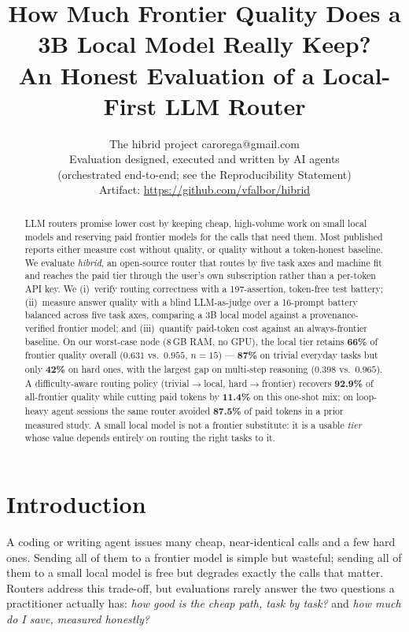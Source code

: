 \documentclass[10pt]{article} %
\title{How Much Frontier Quality Does a 3B Local Model Really Keep?\\
An Honest Evaluation of a Local-First LLM Router}
\author{\name The hibrid project \email carorega@gmail.com \\
      \addr Evaluation designed, executed and written by AI agents\\
      (orchestrated end-to-end; see the Reproducibility Statement)\\
      Artifact: \url{https://github.com/vfalbor/hibrid}}
\begin{document}
\maketitle

\begin{abstract}
LLM routers promise lower cost by keeping cheap, high-volume work on small local models and reserving paid frontier models for the calls that need them. Most published reports either measure cost without quality, or quality without a token-honest baseline. We evaluate \emph{hibrid}, an open-source router that routes by five task axes and machine fit and reaches the paid tier through the user's own subscription rather than a per-token API key. We (i)~verify routing correctness with a 197-assertion, token-free test battery; (ii)~measure answer quality with a blind LLM-as-judge over a 16-prompt battery balanced across five task axes, comparing a 3B local model against a provenance-verified frontier model; and (iii)~quantify paid-token cost against an always-frontier baseline. On our worst-case node (8\,GB RAM, no GPU), the local tier retains \textbf{66\%} of frontier quality overall ($0.631$ vs.\ $0.955$, $n{=}15$) --- \textbf{87\%} on trivial everyday tasks but only \textbf{42\%} on hard ones, with the largest gap on multi-step reasoning ($0.398$ vs.\ $0.965$). A difficulty-aware routing policy (trivial${\to}$local, hard${\to}$frontier) recovers \textbf{92.9\%} of all-frontier quality while cutting paid tokens by \textbf{11.4\%} on this one-shot mix; on loop-heavy agent sessions the same router avoided \textbf{87.5\%} of paid tokens in a prior measured study. A small local model is not a frontier substitute: it is a usable \emph{tier} whose value depends entirely on routing the right tasks to it.
\end{abstract}

\section{Introduction}
\label{sec:intro}

A coding or writing agent issues many cheap, near-identical calls and a few hard ones. Sending all of them to a frontier model is simple but wasteful; sending all of them to a small local model is free but degrades exactly the calls that matter. Routers address this trade-off, but evaluations rarely answer the two questions a practitioner actually has: \emph{how good is the cheap path, task by task?} and \emph{how much do I save, measured honestly?}
\end{document}
